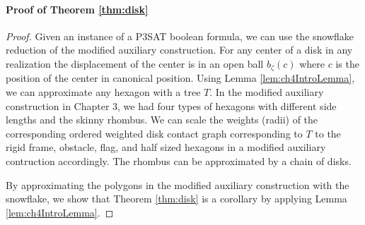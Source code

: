 \paragraph{Proof of Theorem \ref{thm:disk}}

\begin{proof}
Given an instance of a P3SAT boolean formula, we can use the snowflake reduction of the modified auxiliary construction.  
For any center of a disk in any realization the displacement of the center is in an open ball $b_{\zeta}(c)$ where $c$ is the position of the center in canonical position.  
Using Lemma \ref{lem:ch4IntroLemma}, we can approximate any hexagon with a tree $T$.  
In the modified auxiliary construction in Chapter 3, we had four types of hexagons with different side lengths and the skinny rhombus.  
We can scale the weights (radii) of the corresponding ordered weighted disk contact graph corresponding to $T$ to the rigid frame, obstacle, flag, and half sized hexagons in a modified auxiliary contruction accordingly.  
The rhombus can be approximated by a chain of disks.

By approximating the polygons in the modified auxiliary construction with the snowflake, we show that Theorem \ref{thm:disk} is a corollary by applying Lemma \ref{lem:ch4IntroLemma}.  
\end{proof}

